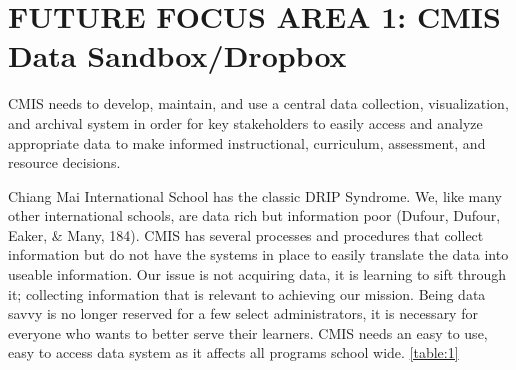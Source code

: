 \section{FUTURE FOCUS AREA 1: CMIS Data Sandbox/Dropbox }

CMIS needs to develop, maintain, and use a central data collection, visualization, and archival system in order for key stakeholders to easily access and analyze appropriate data to make informed instructional, curriculum, assessment, and resource decisions. 


Chiang Mai International School has the classic DRIP Syndrome. We, like many other international schools, are data rich but information poor (Dufour, Dufour, Eaker, \& Many, 184). CMIS has several processes and procedures that collect information but do not have the systems in place to easily translate the data into useable information. Our issue is not acquiring data, it is learning to sift through it; collecting information that is relevant to achieving our mission. Being data savvy is no longer reserved for a few select administrators, it is necessary for everyone who wants to better serve their learners. CMIS needs an easy to use, easy to access data system as it affects all programs school wide. \ref{table:1}


